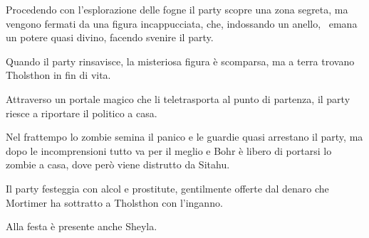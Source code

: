 Procedendo con l'esplorazione delle fogne il party scopre una zona
segreta, ma vengono fermati da una figura incappucciata, che, indossando
un anello, ~emana un potere quasi divino, facendo svenire il party.

Quando il party rinsavisce, la misteriosa figura è scomparsa, ma a terra
trovano Tholsthon in fin di vita.

Attraverso un portale magico che li teletrasporta al punto di partenza,
il party riesce a riportare il politico a casa.

Nel frattempo lo zombie semina il panico e le guardie quasi arrestano il
party, ma dopo le incomprensioni tutto va per il meglio e Bohr è libero
di portarsi lo zombie a casa, dove però viene distrutto da Sitahu.

Il party festeggia con alcol e prostitute, gentilmente offerte dal
denaro che Mortimer ha sottratto a Tholsthon con l'inganno.

Alla festa è presente anche Sheyla.
